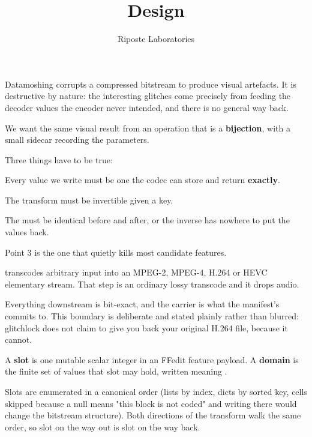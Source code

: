 \documentclass[fontpath=fonts/,logopath=logo/]{riposte-doc}
\title{Design}
\author{Riposte Laboratories}
\date{}
\begin{document}
\ripmakehead

\riptoc



Datamoshing corrupts a compressed bitstream to produce visual artefacts. It is destructive by nature: the interesting glitches come precisely from feeding the decoder values the encoder never intended, and there is no general way back.

We want the same visual result from an operation that is a \textbf{bijection}, with a small sidecar recording the parameters.

Three things have to be true:

\begin{ripnumbers}
\item Every value we write must be one the codec can store and return \textbf{exactly}.
\item The transform must be invertible given a key.
\item The  must be identical before and after, or the inverse has nowhere to put the values back.
\end{ripnumbers}

Point 3 is the one that quietly kills most candidate features.



 transcodes arbitrary input into an MPEG-2, MPEG-4, H.264 or HEVC elementary stream. That step is an ordinary lossy transcode and it drops audio.

Everything downstream is bit-exact, and the carrier is what the manifest's  commits to. This boundary is deliberate and stated plainly rather than blurred: glitchlock does not claim to give you back your original H.264 file, because it cannot.



A \textbf{slot} is one mutable scalar integer in an FFedit feature payload. A \textbf{domain} is the finite set of values that slot may hold, written  meaning .

Slots are enumerated in a canonical order (lists by index, dicts by sorted key,  cells skipped because a null means "this block is not coded" and writing there would change the bitstream structure). Both directions of the transform walk the same order, so slot  on the way out is slot  on the way back.
\end{document}
